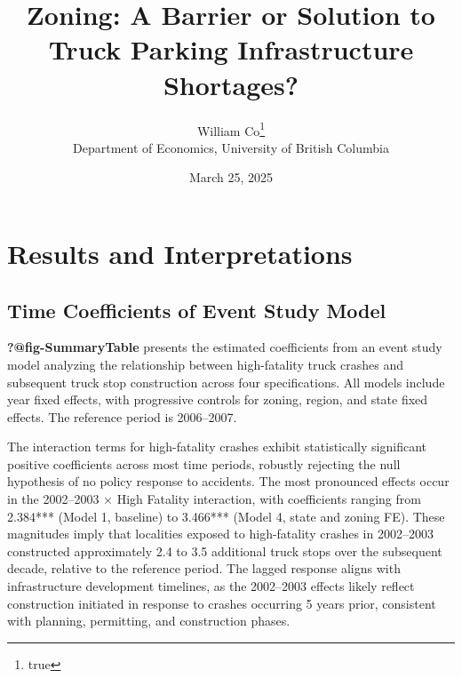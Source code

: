 \documentclass[
  12pt]{article}
\begin{document}
\def\spacingset#1{\renewcommand{\baselinestretch}%
{#1}\small\normalsize} \spacingset{1}



\date{March 25, 2025}
\title{\bf Zoning: A Barrier or Solution to Truck Parking Infrastructure
Shortages?}
\author{
William Co\thanks{true}\\
Department of Economics, University of British Columbia\\
}
\maketitle

\bigskip
\bigskip
\begin{abstract}

\end{abstract}


\newpage
\spacingset{1.9} %

\section{Results and Interpretations}\label{results-and-interpretations}

\subsection{Time Coefficients of Event Study
Model}\label{time-coefficients-of-event-study-model}

\textbf{?@fig-SummaryTable} presents the estimated coefficients from an
event study model analyzing the relationship between high-fatality truck
crashes and subsequent truck stop construction across four
specifications. All models include year fixed effects, with progressive
controls for zoning, region, and state fixed effects. The reference
period is 2006--2007.

The interaction terms for high-fatality crashes exhibit statistically
significant positive coefficients across most time periods, robustly
rejecting the null hypothesis of no policy response to accidents. The
most pronounced effects occur in the 2002--2003 × High Fatality
interaction, with coefficients ranging from 2.384*** (Model 1, baseline)
to 3.466*** (Model 4, state and zoning FE). These magnitudes imply that
localities exposed to high-fatality crashes in 2002--2003 constructed
approximately 2.4 to 3.5 additional truck stops over the subsequent
decade, relative to the reference period. The lagged response aligns
with infrastructure development timelines, as the 2002--2003 effects
likely reflect construction initiated in response to crashes occurring 5
years prior, consistent with planning, permitting, and construction
phases.
\end{document}

